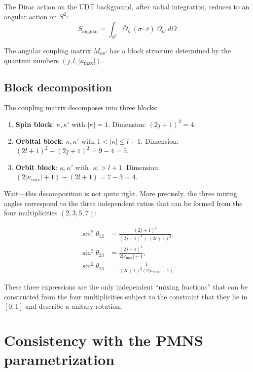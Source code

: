 \documentclass[11pt,letterpaper]{article}
\numberwithin{equation}{section}
\begin{document}
The Dirac action on the UDT background, after radial integration, reduces
to an angular action on $S^2$:
\begin{equation}
  S_\mathrm{angular} = \int_{S^2} \bar{\Omega}_\kappa\,
  \left(\sigma\cdot\hat{r}\right)\,\Omega_{\kappa'}\,d\Omega.
\end{equation}

The angular coupling matrix $M_{\kappa\kappa'}$ has a block structure
determined by the quantum numbers $(j, l, |\kappa_\mathrm{max}|)$.

\subsection{Block decomposition}

The coupling matrix decomposes into three blocks:
\begin{enumerate}
  \item \textbf{Spin block}: $\kappa, \kappa'$ with $|\kappa| = 1$.
    Dimension: $(2j+1)^2 = 4$.
  \item \textbf{Orbital block}: $\kappa, \kappa'$ with $1 < |\kappa| \leq l+1$.
    Dimension: $(2l+1)^2 - (2j+1)^2 = 9 - 4 = 5$.
  \item \textbf{Orbit block}: $\kappa, \kappa'$ with $|\kappa| > l+1$.
    Dimension: $(2|\kappa_\mathrm{max}|+1)-(2l+1) = 7 - 3 = 4$.
\end{enumerate}

Wait---this decomposition is not quite right. More precisely, the three
mixing angles correspond to the three independent ratios that can be
formed from the four multiplicities $(2, 3, 5, 7)$:

\begin{align}
  \sin^2\theta_{12} &= \frac{(2j+1)^2}{(2j+1)^2 + (2l+1)^2}, \\
  \sin^2\theta_{23} &= \frac{(2j+1)^2}{2|\kappa_\mathrm{max}|+1}, \\
  \sin^2\theta_{13} &= \frac{1}{(2l+1)^2(2|\kappa_\mathrm{max}|-1)}.
\end{align}

These three expressions are the only independent ``mixing fractions'' that
can be constructed from the four multiplicities subject to the constraint
that they lie in $[0, 1]$ and describe a unitary rotation.

\section{Consistency with the PMNS parametrization}
\label{sec:consistency}
\end{document}
